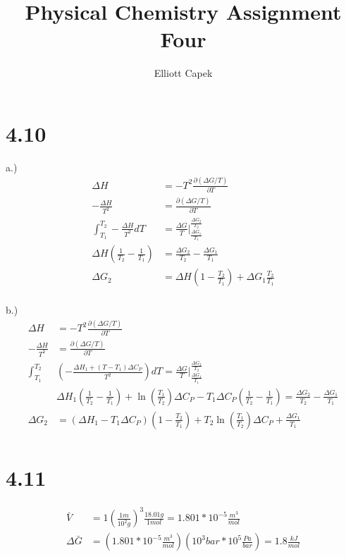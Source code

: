 \documentclass[10pt]{article} %
\title{Physical Chemistry Assignment Four}
\author{Elliott Capek}
\begin{document}
\maketitle{}

\section{4.10}

a.)
\begin{align*}
  \Delta H &= -T^2\frac{\partial (\Delta G/T)}{\partial T}\\
  -\frac{\Delta H}{T^2} &= \frac{\partial (\Delta G/T)}{\partial T}\\
  \int_{T_1}^{T_2} -\frac{\Delta H}{T^2}dT &= \frac{\Delta G}{T}\Bigg|_{\frac{\Delta G_1}{T_1}}^{\frac{\Delta G_2}{T_2}}\\
  \Delta H\left(\frac{1}{T_2} - \frac{1}{T_1}\right) &= \frac{\Delta G_2}{T_2} - \frac{\Delta G_1}{T_1}\\
  \Delta G_2 &= \Delta H\left(1 - \frac{T_2}{T_1}\right) + \Delta G_1 \frac{T_2}{T_1}\\
\end{align*}

b.)
\begin{align*}
  \Delta H &= -T^2\frac{\partial (\Delta G/T)}{\partial T}\\
  -\frac{\Delta H}{T^2} &= \frac{\partial (\Delta G/T)}{\partial T}\\
  \int_{T_1}^{T_2} &\left(-\frac{\Delta H_1 + (T-T_1)\Delta C_P}{T^2}\right)dT = \frac{\Delta G}{T}\Bigg|_{\frac{\Delta G_1}{T_1}}^{\frac{\Delta G_2}{T_2}}\\
  &\Delta H_1\left(\frac{1}{T_2}-\frac{1}{T_1}\right) + \ln\left(\frac{T_1}{T_2}\right)\Delta C_P - T_1\Delta C_P\left(\frac{1}{T_2}-\frac{1}{T_1}\right) = \frac{\Delta G_2}{T_2} - \frac{\Delta G_1}{T_1}\\
  \Delta G_2 &= \left(\Delta H_1 - T_1\Delta C_P\right)\left(1 - \frac{T_2}{T_1}\right) + T_2\ln\left(\frac{T_1}{T_2}\right)\Delta C_P + \frac{\Delta G_1}{T_1}\\
\end{align*}

\section{4.11}
\begin{align*}
  \bar{V} &= 1 \left(\frac{1 m}{10^2 g}\right)^3 \frac{18.01 g}{1 mol} = 1.801 * 10^{-5} \frac{m^3}{mol}\\
  \Delta\bar{G} &= \left(1.801 * 10^{-5} \frac{m^3}{mol}\right)\left(10^3 bar * 10^5 \frac{Pa}{bar}\right) = 1.8 \frac{kJ}{mol}\\
\end{align*}
\end{document}
